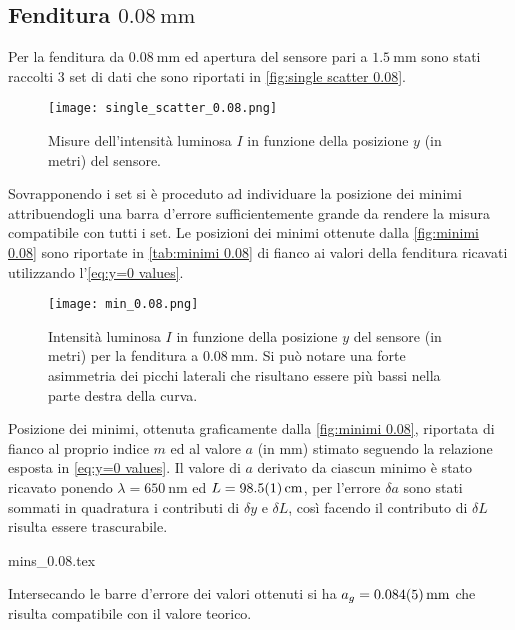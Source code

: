 \documentclass[../main.tex]{subfiles}
\begin{document}
\subsection{Fenditura $\qty{0.08}{\milli\metre}$}

Per la fenditura da $\qty{0.08}{\mm}$ ed apertura del sensore pari a $\qty{1.5}{\mm}$ sono stati raccolti $3$ set di dati che sono riportati in \autoref{fig:single scatter 0.08}.

\begin{figure}[ht!]
    \centering
    \texttt{[image: single\_scatter\_0.08.png]}
    \caption{Misure dell'intensità luminosa $I$ in funzione della posizione $y$ (in metri) del sensore.} %
    \label{fig:single scatter 0.08}
\end{figure}

Sovrapponendo i set si è proceduto ad individuare la posizione dei minimi attribuendogli una barra d'errore sufficientemente grande da rendere la misura compatibile con tutti i set. Le posizioni dei minimi ottenute dalla \autoref{fig:minimi 0.08} sono riportate in \autoref{tab:minimi 0.08} di fianco ai valori della fenditura ricavati utilizzando l'\autoref{eq:y=0 values}.

\begin{figure}[ht!]
    \centering
    \texttt{[image: min\_0.08.png]}
    \caption{Intensità luminosa $I$ in funzione della posizione $y$ del sensore (in metri) per la fenditura a $\qty{0.08}{\mm}$. Si può notare una forte asimmetria dei picchi laterali che risultano essere più bassi nella parte destra della curva.} %
    \label{fig:minimi 0.08}
\end{figure}

\begin{table}[ht!]
    \centering
    \caption{Posizione dei minimi, ottenuta graficamente dalla \autoref{fig:minimi 0.08}, riportata di fianco al proprio indice $m$ ed al valore $a$ (in $\si{\mm}$) stimato seguendo la relazione esposta in \autoref{eq:y=0 values}. Il valore di $a$ derivato da ciascun minimo è stato ricavato ponendo $\lambda = \qty{650}{\nm}$ ed $L = \qty{98.5+-0.1}{\cm}$, per l'errore $\delta a$ sono stati sommati in quadratura i contributi di $\delta y$ e $\delta L$, così facendo il contributo di $\delta L$ risulta essere trascurabile.}
    {mins_0.08.tex}
    \label{tab:minimi 0.08}
\end{table}

Intersecando le barre d'errore dei valori ottenuti si ha $a_g = \qty{0.084+-0.005}{\mm}$ che risulta compatibile con il valore teorico.
\end{document}
